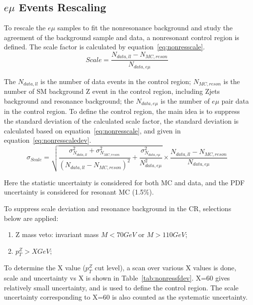 \subsection{$e\mu$ Events Rescaling}
To rescale the $e\mu$ samples to fit the nonresonance background and study the agreement of the background sample and data, a nonresonant control region is defined. The scale factor is calculated by equation~\ref{eq:nonresscale}.
\begin{equation} \label{eq:nonresscale}
  Scale  =  \frac{N_{data,ll}-N_{MC,reson}}{N_{data,e\mu}}
\end{equation}

The $N_{data,ll}$ is the number of data events in the control region; $N_{MC,reson}$ is the number of SM background Z event in the control region, including Zjets background and resonance background; the $N_{data,e\mu}$ is the number of $e\mu$ pair data in the control region. To define the control region, the main idea is to suppress the standard deviation of the calculated scale factor, the standard deviation is calculated based on equation~\ref{eq:nonresscale}, and given in equation~\ref{eq:nonresscaledev}.
\begin{equation} \label{eq:nonresscaledev}
  \sigma_{Scale}  = \sqrt{\frac{\sigma^{2}_{N_{data,ll}}+\sigma^{2}_{N_{MC,reson}}}{(N_{data,ll}-N_{MC,reson})^{2}}+\frac{\sigma^{2}_{N_{data,e\mu}}}{N^{2}_{data,e\mu}}}\times \frac{N_{data,ll}-N_{MC,reson}}{N_{data,e\mu}}
\end{equation}

Here the statistic uncertainty is considered for both MC and data, and the PDF uncertainty is considered for resonant MC (1.5\%).

\vspace{0.3cm}
To suppress scale deviation and resonance background in the CR, selections below are applied: 
\begin{enumerate}
\item Z mass veto: invariant mass $M<70GeV$ or $M>110GeV$; 
\item $p_{T}^{Z} > X GeV$;
\end{enumerate}

To determine the X value ($p_{T}^{Z}$ cut level), a scan over various X values is done, scale and uncertainty vs X is shown in Table~\ref{tab:nonressfdev}. X=60 gives relatively small uncertainty, and is used to define the control region. The scale uncertainty corresponding to X=60 is also counted as the systematic uncertainty.

